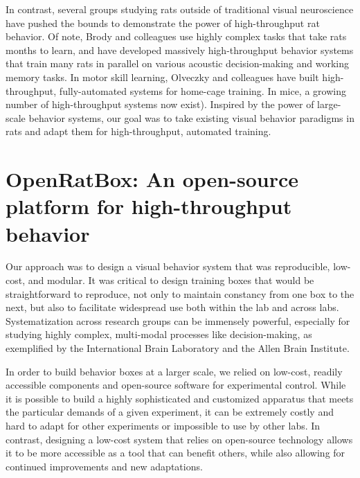 In contrast, several groups studying rats outside of traditional visual neuroscience have pushed the bounds to demonstrate the power of high-throughput rat behavior. Of note, Brody and colleagues use highly complex tasks that take rats months to learn, and have developed massively high-throughput behavior systems that train many rats in parallel on various acoustic decision-making and working memory tasks\cite{Miller2017TwoStep, Brunton2013RatsFrom}. In motor skill learning, Olveczky and colleagues have built high-throughput, fully-automated systems for home-cage training\cite{Poddar2013}. In mice, a growing number of high-throughput systems now exist\cite{Qiao2018}). Inspired by the power of large-scale behavior systems, our goal was to take existing visual behavior paradigms in rats and adapt them for high-throughput, automated training. 



\section{OpenRatBox: An open-source platform for high-throughput behavior}
Our approach was to design a visual behavior system that was reproducible, low-cost, and modular. It was critical to design training boxes that would be straightforward to reproduce, not only to maintain constancy from one box to the next, but also to facilitate widespread use both within the lab and across labs. Systematization across research groups can be immensely powerful, especially for studying highly complex, multi-modal processes like decision-making, as exemplified by the International Brain Laboratory\cite{IBL} and the Allen Brain Institute\cite{REFREF}.

In order to build behavior boxes at a larger scale, we relied on low-cost, readily accessible components and open-source software for experimental control. While it is possible to build a highly sophisticated and customized apparatus that meets the particular demands of a given experiment, it can be extremely costly and hard to adapt for other experiments or impossible to use by other labs. In contrast, designing a low-cost system that relies on open-source technology allows it to be more accessible as a tool that can benefit others, while also allowing for continued improvements and new adaptations. 

